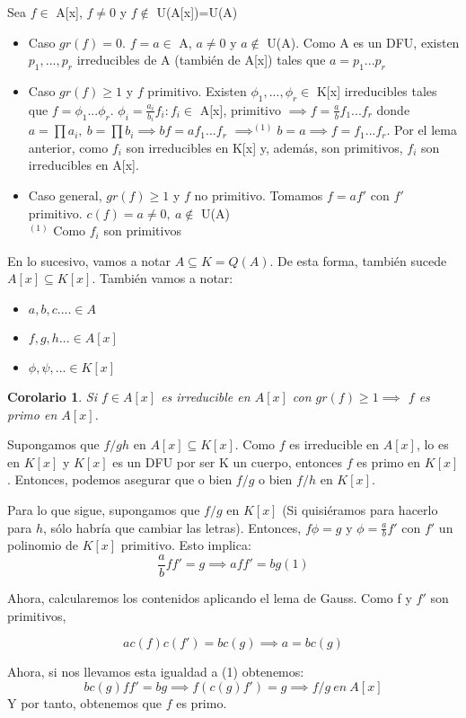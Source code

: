 \documentclass[11pt, a4paper, titlepage]{article}
\makeatletter
\newif\IfInSansMode
\let\oldsf\sffamily
\renewcommand*{\sffamily}{\oldsf\mathversion{sans}\InSansModetrue}
\let\oldnorm\normalfont
\renewcommand*{\normalfont}{\oldnorm\InSansModefalse\mathversion{normal}}
\renewenvironment{proof}[1][\proofname] {\vspace{-15pt}\par\pushQED{\qed}\normalfont\topsep6\p@\@plus6\p@\relax\trivlist\item[\hskip\labelsep\it#1\@addpunct{.}]\ignorespaces}{\popQED\endtrivlist\@endpefalse}
\renewenvironment{proof}[1][\proofname] {\par\pushQED{\qed}\normalfont\topsep6\p@\@plus6\p@\relax\trivlist\item[\hskip\labelsep\itshape\sffamily#1\@addpunct{.}]\ignorespaces}{\popQED\endtrivlist\@endpefalse}
\theoremstyle{theorem-style}
\newtheorem{ncor}{Corolario}[section]
\theoremstyle{definition-style}
\theoremstyle{remark-style}
\theoremstyle{example-style}
\makeatother
\begin{document}
\begin{proof}
Sea $f \in$ A[x], $f \neq 0$ y $f \notin$ U(A[x])=U(A)
\begin{itemize}
	\item Caso $gr(f) = 0$. $f = a \in$ A, $a \neq 0$ y $a \notin$ U(A). Como A es un DFU, existen $p_1,...,p_r$ irreducibles de A (también de A[x]) tales que $a = p_1...p_r$
	\item Caso $gr(f) \geq 1$ y $f$ primitivo. Existen $\phi_1,...,\phi_r \in$ K[x] irreducibles tales que $f=\phi_1...\phi_r$. $\phi_i = \frac{a_i}{b_i}f_i : f_i \in$ A[x], primitivo $\implies f = \frac{a}{b}f_1...f_r$ donde $a=\prod a_i,\ b=\prod b_i \implies bf = af_1...f_r$ $\implies^{(1)} b=a \implies f = f_1...f_r$. Por el lema anterior, como $f_i$ son irreducibles en K[x] y, además, son primitivos, $f_i$ son irreducibles en A[x].
	\item Caso general, $gr(f) \geq 1$ y $f$ no primitivo. Tomamos $f=af'$
con $f'$ primitivo. $c(f) = a \neq 0,\ a \notin$ U(A)\\
$^{(1)}$ Como $f_i$ son primitivos
\end{itemize}
\end{proof}


En lo sucesivo, vamos a notar $A\subseteq K = Q(A)$. De esta forma, también sucede $A[x] \subseteq K[x]$. También vamos a notar:
\begin{itemize}
	\item $a,b,c.... \in A$
	\item $f,g,h... \in A[x]$
	\item $\phi,\psi, ... \in K[x]$
\end{itemize}

\begin{ncor}
	Si $f\in A[x]$ es irreducible en $A[x]$ con $gr(f) \geq 1\implies$ $f$ es primo en $A[x]$.
\end{ncor}
\begin{proof}
	Supongamos que $f/gh$ en $A[x]\subseteq K[x]$. Como $f$ es irreducible en $A[x]$, lo  es en $K[x]$ y $K[x]$ es un DFU por ser K un cuerpo, entonces $f$ es primo en $K[x]$. Entonces, podemos asegurar que o bien $f/g$ o bien $f/h$ en $K[x]$.

	Para lo que sigue, supongamos que $f/g$ en $K[x]$ (Si quisiéramos para hacerlo para $h$, sólo habría que cambiar las letras). Entonces, $f\phi = g $ y $\phi = \frac{a}{b}f'$ con $f'$ un polinomio de $K[x]$ primitivo. Esto implica: $$\frac{a}{b}ff'=g \implies aff' = bg(1)$$

	Ahora, calcularemos los contenidos aplicando el lema de Gauss. Como f y $f'$ son primitivos,

	$$ a c(f)c(f') = bc(g) \implies a = bc(g)$$

	Ahora, si nos llevamos esta igualdad a (1) obtenemos:
	\[
	bc(g)ff'=bg \implies f(c(g)f')=g \implies f/g \ en \ A[x]
	\]
	Y por tanto, obtenemos que $f$ es primo.
\end{proof}
\end{document}

